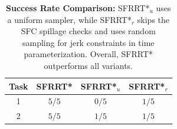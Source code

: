 \begin{table}[H]
\begin{center}
\renewcommand{\arraystretch}{1.5}
\begin{tabular}{|c | c | c| c|} 
 \hline
 Task & \textbf{SFRRT*} & SFRRT*$_{u}$ & SFRRT*$_{r}$ \\\hline
  1 & \textbf{$5 / 5$} & $0 / 5$ & $1 / 5$ \\\hline 
  2 & \textbf{$5 / 5$} & $1 / 5$ & $1 / 5$ \\\hline
\end{tabular}

\caption{\label{table:ablation} \textbf{Success Rate Comparison:} 
SFRRT*$_{u}$ uses a uniform sampler, while SFRRT*$_{r}$ skips the SFC spillage checks and uses random sampling for jerk constraints in time parameterization. Overall, SFRRT* outperforms all variants.
}
\end{center}
\end{table}
